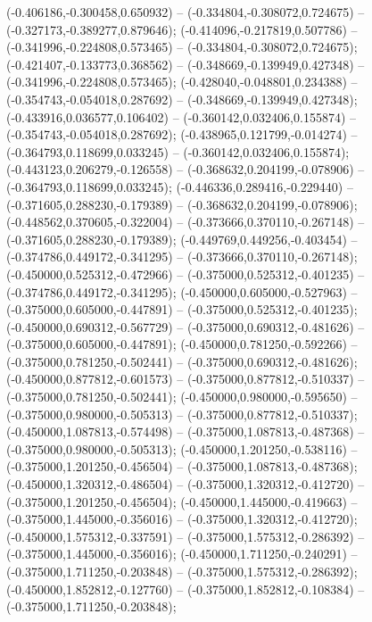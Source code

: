  (-0.406186,-0.300458,0.650932) -- (-0.334804,-0.308072,0.724675) -- (-0.327173,-0.389277,0.879646);
 (-0.414096,-0.217819,0.507786) -- (-0.341996,-0.224808,0.573465) -- (-0.334804,-0.308072,0.724675);
 (-0.421407,-0.133773,0.368562) -- (-0.348669,-0.139949,0.427348) -- (-0.341996,-0.224808,0.573465);
 (-0.428040,-0.048801,0.234388) -- (-0.354743,-0.054018,0.287692) -- (-0.348669,-0.139949,0.427348);
 (-0.433916,0.036577,0.106402) -- (-0.360142,0.032406,0.155874) -- (-0.354743,-0.054018,0.287692);
 (-0.438965,0.121799,-0.014274) -- (-0.364793,0.118699,0.033245) -- (-0.360142,0.032406,0.155874);
 (-0.443123,0.206279,-0.126558) -- (-0.368632,0.204199,-0.078906) -- (-0.364793,0.118699,0.033245);
 (-0.446336,0.289416,-0.229440) -- (-0.371605,0.288230,-0.179389) -- (-0.368632,0.204199,-0.078906);
 (-0.448562,0.370605,-0.322004) -- (-0.373666,0.370110,-0.267148) -- (-0.371605,0.288230,-0.179389);
 (-0.449769,0.449256,-0.403454) -- (-0.374786,0.449172,-0.341295) -- (-0.373666,0.370110,-0.267148);
 (-0.450000,0.525312,-0.472966) -- (-0.375000,0.525312,-0.401235) -- (-0.374786,0.449172,-0.341295);
 (-0.450000,0.605000,-0.527963) -- (-0.375000,0.605000,-0.447891) -- (-0.375000,0.525312,-0.401235);
 (-0.450000,0.690312,-0.567729) -- (-0.375000,0.690312,-0.481626) -- (-0.375000,0.605000,-0.447891);
 (-0.450000,0.781250,-0.592266) -- (-0.375000,0.781250,-0.502441) -- (-0.375000,0.690312,-0.481626);
 (-0.450000,0.877812,-0.601573) -- (-0.375000,0.877812,-0.510337) -- (-0.375000,0.781250,-0.502441);
 (-0.450000,0.980000,-0.595650) -- (-0.375000,0.980000,-0.505313) -- (-0.375000,0.877812,-0.510337);
 (-0.450000,1.087813,-0.574498) -- (-0.375000,1.087813,-0.487368) -- (-0.375000,0.980000,-0.505313);
 (-0.450000,1.201250,-0.538116) -- (-0.375000,1.201250,-0.456504) -- (-0.375000,1.087813,-0.487368);
 (-0.450000,1.320312,-0.486504) -- (-0.375000,1.320312,-0.412720) -- (-0.375000,1.201250,-0.456504);
 (-0.450000,1.445000,-0.419663) -- (-0.375000,1.445000,-0.356016) -- (-0.375000,1.320312,-0.412720);
 (-0.450000,1.575312,-0.337591) -- (-0.375000,1.575312,-0.286392) -- (-0.375000,1.445000,-0.356016);
 (-0.450000,1.711250,-0.240291) -- (-0.375000,1.711250,-0.203848) -- (-0.375000,1.575312,-0.286392);
 (-0.450000,1.852812,-0.127760) -- (-0.375000,1.852812,-0.108384) -- (-0.375000,1.711250,-0.203848);
